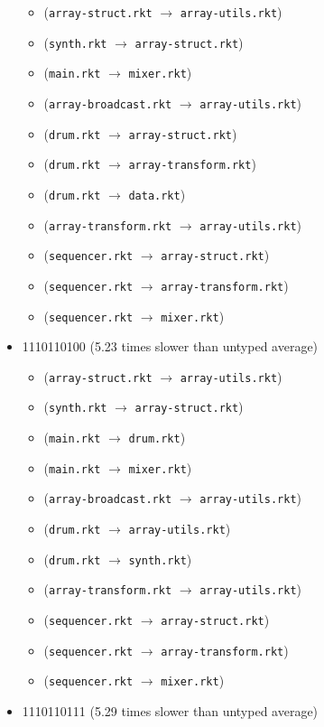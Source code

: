 \documentclass{article}
\newcommand{\mono}[1]{\texttt{#1}}
\begin{document}
\begin{itemize}
\begin{itemize}
  \item (\mono{array-struct.rkt} $\rightarrow$ \mono{array-utils.rkt})
  \item (\mono{synth.rkt} $\rightarrow$ \mono{array-struct.rkt})
  \item (\mono{main.rkt} $\rightarrow$ \mono{mixer.rkt})
  \item (\mono{array-broadcast.rkt} $\rightarrow$ \mono{array-utils.rkt})
  \item (\mono{drum.rkt} $\rightarrow$ \mono{array-struct.rkt})
  \item (\mono{drum.rkt} $\rightarrow$ \mono{array-transform.rkt})
  \item (\mono{drum.rkt} $\rightarrow$ \mono{data.rkt})
  \item (\mono{array-transform.rkt} $\rightarrow$ \mono{array-utils.rkt})
  \item (\mono{sequencer.rkt} $\rightarrow$ \mono{array-struct.rkt})
  \item (\mono{sequencer.rkt} $\rightarrow$ \mono{array-transform.rkt})
  \item (\mono{sequencer.rkt} $\rightarrow$ \mono{mixer.rkt})
  \end{itemize}
\item 1110110100 (5.23 times slower than untyped average)
  \begin{itemize}
  \item (\mono{array-struct.rkt} $\rightarrow$ \mono{array-utils.rkt})
  \item (\mono{synth.rkt} $\rightarrow$ \mono{array-struct.rkt})
  \item (\mono{main.rkt} $\rightarrow$ \mono{drum.rkt})
  \item (\mono{main.rkt} $\rightarrow$ \mono{mixer.rkt})
  \item (\mono{array-broadcast.rkt} $\rightarrow$ \mono{array-utils.rkt})
  \item (\mono{drum.rkt} $\rightarrow$ \mono{array-utils.rkt})
  \item (\mono{drum.rkt} $\rightarrow$ \mono{synth.rkt})
  \item (\mono{array-transform.rkt} $\rightarrow$ \mono{array-utils.rkt})
  \item (\mono{sequencer.rkt} $\rightarrow$ \mono{array-struct.rkt})
  \item (\mono{sequencer.rkt} $\rightarrow$ \mono{array-transform.rkt})
  \item (\mono{sequencer.rkt} $\rightarrow$ \mono{mixer.rkt})
  \end{itemize}
\item 1110110111 (5.29 times slower than untyped average)

\end{itemize}
\end{document}
